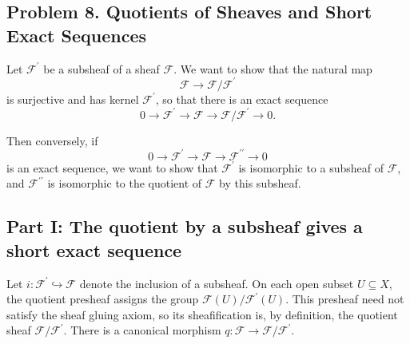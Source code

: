 
\subsection*{Problem 8. Quotients of Sheaves and Short Exact Sequences}

Let \(\mathcal{F}^{\prime}\) be a subsheaf of a sheaf \(\mathcal{F}\). We want to show that the natural map
\[
\mathcal{F}\longrightarrow \mathcal{F}/\mathcal{F}^{\prime}
\]
is surjective and has kernel \(\mathcal{F}^{\prime}\), so that there is an exact sequence
\[
0\longrightarrow \mathcal{F}^{\prime} \longrightarrow \mathcal{F} \longrightarrow \mathcal{F}/\mathcal{F}^{\prime} \longrightarrow 0.
\]

Then conversely, if
\[
0\longrightarrow \mathcal{F}^{\prime} \longrightarrow \mathcal{F} \longrightarrow \mathcal{F}^{\prime\prime} \longrightarrow 0
\]
is an exact sequence, we want to show that \(\mathcal{F}^{\prime}\) is isomorphic to a subsheaf of \(\mathcal{F}\), and \(\mathcal{F}^{\prime\prime}\) is isomorphic to the quotient of \(\mathcal{F}\) by this subsheaf.

\subsection{Part I: The quotient by a subsheaf gives a short exact sequence}

Let \(i:\mathcal{F}^{\prime}\hookrightarrow\mathcal{F}\) denote the inclusion of a
subsheaf. On each open subset \(U\subseteq X\), the quotient presheaf assigns the
group \(\mathcal{F}(U)/\mathcal{F}^{\prime}(U)\). This presheaf need not satisfy the
sheaf gluing axiom, so its sheafification is, by definition, the quotient sheaf
\(\mathcal{F}/\mathcal{F}^{\prime}\). There is a canonical morphism
\(q:\mathcal{F}\to\mathcal{F}/\mathcal{F}^{\prime}\).

